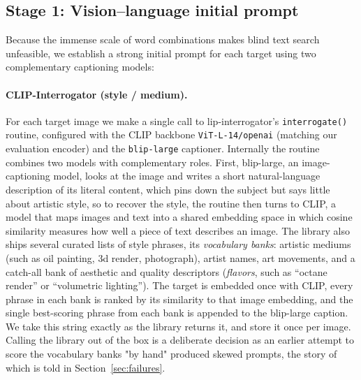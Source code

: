 \documentclass[runningheads]{llncs}
\begin{document}
\subsection{Stage 1: Vision–language initial prompt}
Because the immense scale of word combinations makes blind text search unfeasible, we establish a strong initial prompt for each target using two complementary captioning models:

\paragraph{\normalfont\textbf{CLIP-Interrogator (style / medium).}} For each target image we make a single call to lip-interrogator's \texttt{interrogate()} routine, configured with the CLIP backbone \texttt{ViT-L-14/openai} (matching our evaluation encoder) and the \texttt{blip-large} captioner. Internally the routine combines two models with complementary roles. First, blip-large, an image-captioning model, looks at the image and writes a short natural-language description of its literal content, which pins down the subject but says little about artistic style, so to recover the style, the routine then turns to CLIP, a model that maps images and text into a shared embedding space in which cosine similarity measures how well a piece of text describes an image. The library also ships several curated lists of style phrases, its \emph{vocabulary banks}: artistic mediums (such as oil painting, 3d render, photograph), artist names, art movements, and a catch-all bank of aesthetic and quality descriptors (\emph{flavors}, such as ``octane render'' or ``volumetric lighting''). The target is embedded once with CLIP, every phrase in each bank is ranked by its similarity to that image embedding, and the single best-scoring phrase from each bank is appended to the blip-large caption. We take this string exactly as the library returns it, and store it once per image. Calling the library out of the box is a deliberate decision as an earlier attempt to score the vocabulary banks "by hand" produced skewed prompts, the story of which is told in Section~\ref{sec:failures}.
\end{document}
